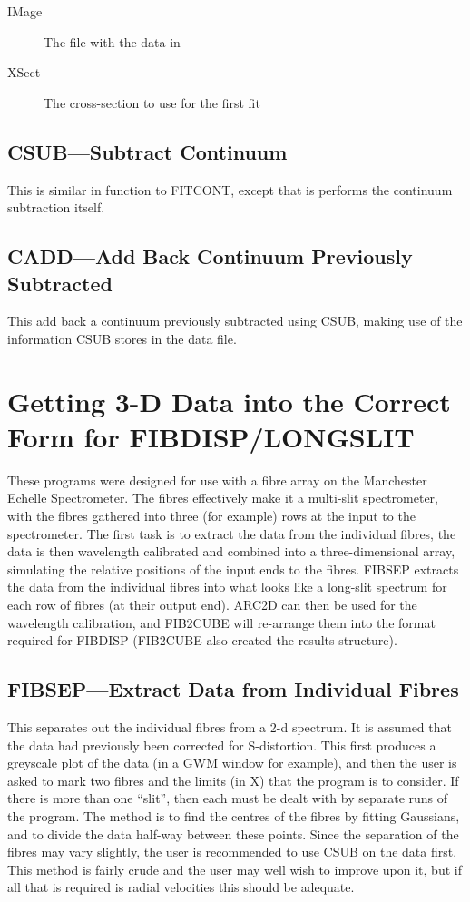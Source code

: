\begin{description}
\item[IMage] The file with the data in
\item[XSect] The cross-section to use for the first fit
\end{description}


\subsection{CSUB---Subtract Continuum}

This is similar in function to FITCONT, except that is performs the
continuum subtraction itself.

\subsection{CADD---Add Back Continuum Previously Subtracted}

This add back a continuum previously subtracted using CSUB, making use
of the information CSUB stores in the data file.

\section{Getting 3-D Data into the Correct Form for FIBDISP/LONGSLIT}

These programs were designed for use with a fibre array on the
Manchester Echelle Spectrometer.
The fibres effectively make it a multi-slit spectrometer, with the
fibres gathered into three (for example) rows at the input to the
spectrometer.
The first task is to extract the data from the individual fibres, the
data is then wavelength calibrated and combined into a three-dimensional
array, simulating the relative positions of the input ends to the
fibres.
FIBSEP extracts the data from the individual fibres into what looks like a
long-slit spectrum for each row of fibres (at their output end).
ARC2D can then be used for the wavelength calibration, and FIB2CUBE will
re-arrange them into the format required for FIBDISP (FIB2CUBE also
created the results structure).

\subsection{FIBSEP---Extract Data from Individual Fibres}

This separates out the individual fibres from a 2-d spectrum. It is
assumed that the data had previously been corrected for S-distortion.
This first produces a greyscale plot of the data (in a GWM window for
example), and then the user is asked to mark two fibres and the limits
(in X) that the program is to consider.
If there is more than one ``slit'', then each must be dealt with by
separate runs of the program.
The method is to find the centres of the fibres by fitting Gaussians,
and to divide the data half-way between these points. Since the
separation of the fibres may vary slightly, the user is recommended
to use CSUB on the data first. This method is fairly crude and the user
may well wish to improve upon it, but if all that is required is radial
velocities this should be adequate.

